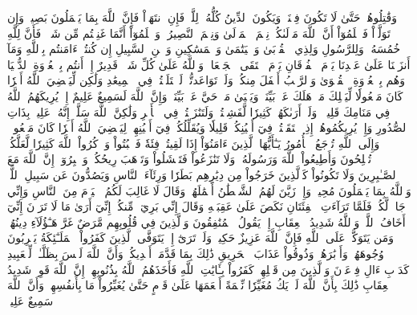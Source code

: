وَقَٰتِلُوهُمۡ حَتَّىٰ لَا تَكُونَ فِتۡنَةٞ وَيَكُونَ ٱلدِّينُ كُلُّهُۥ لِلَّهِۚ فَإِنِ ٱنتَهَوۡاْ فَإِنَّ ٱللَّهَ بِمَا يَعۡمَلُونَ بَصِيرٞ
وَإِن تَوَلَّوۡاْ فَٱعۡلَمُوٓاْ أَنَّ ٱللَّهَ مَوۡلَىٰكُمۡۚ نِعۡمَ ٱلۡمَوۡلَىٰ وَنِعۡمَ ٱلنَّصِيرُ
۞وَٱعۡلَمُوٓاْ أَنَّمَا غَنِمۡتُم مِّن شَيۡءٖ فَأَنَّ لِلَّهِ خُمُسَهُۥ وَلِلرَّسُولِ وَلِذِي ٱلۡقُرۡبَىٰ وَٱلۡيَتَٰمَىٰ وَٱلۡمَسَٰكِينِ وَٱبۡنِ ٱلسَّبِيلِ إِن كُنتُمۡ ءَامَنتُم بِٱللَّهِ وَمَآ أَنزَلۡنَا عَلَىٰ عَبۡدِنَا يَوۡمَ ٱلۡفُرۡقَانِ يَوۡمَ ٱلۡتَقَى ٱلۡجَمۡعَانِۗ وَٱللَّهُ عَلَىٰ كُلِّ شَيۡءٖ قَدِيرٌ
إِذۡ أَنتُم بِٱلۡعُدۡوَةِ ٱلدُّنۡيَا وَهُم بِٱلۡعُدۡوَةِ ٱلۡقُصۡوَىٰ وَٱلرَّكۡبُ أَسۡفَلَ مِنكُمۡۚ وَلَوۡ تَوَاعَدتُّمۡ لَٱخۡتَلَفۡتُمۡ فِي ٱلۡمِيعَٰدِ وَلَٰكِن لِّيَقۡضِيَ ٱللَّهُ أَمۡرٗا كَانَ مَفۡعُولٗا لِّيَهۡلِكَ مَنۡ هَلَكَ عَنۢ بَيِّنَةٖ وَيَحۡيَىٰ مَنۡ حَيَّ عَنۢ بَيِّنَةٖۗ وَإِنَّ ٱللَّهَ لَسَمِيعٌ عَلِيمٌ
إِذۡ يُرِيكَهُمُ ٱللَّهُ فِي مَنَامِكَ قَلِيلٗاۖ وَلَوۡ أَرَىٰكَهُمۡ كَثِيرٗا لَّفَشِلۡتُمۡ وَلَتَنَٰزَعۡتُمۡ فِي ٱلۡأَمۡرِ وَلَٰكِنَّ ٱللَّهَ سَلَّمَۚ إِنَّهُۥ عَلِيمُۢ بِذَاتِ ٱلصُّدُورِ
وَإِذۡ يُرِيكُمُوهُمۡ إِذِ ٱلۡتَقَيۡتُمۡ فِيٓ أَعۡيُنِكُمۡ قَلِيلٗا وَيُقَلِّلُكُمۡ فِيٓ أَعۡيُنِهِمۡ لِيَقۡضِيَ ٱللَّهُ أَمۡرٗا كَانَ مَفۡعُولٗاۗ وَإِلَى ٱللَّهِ تُرۡجَعُ ٱلۡأُمُورُ
يَـٰٓأَيُّهَا ٱلَّذِينَ ءَامَنُوٓاْ إِذَا لَقِيتُمۡ فِئَةٗ فَٱثۡبُتُواْ وَٱذۡكُرُواْ ٱللَّهَ كَثِيرٗا لَّعَلَّكُمۡ تُفۡلِحُونَ
وَأَطِيعُواْ ٱللَّهَ وَرَسُولَهُۥ وَلَا تَنَٰزَعُواْ فَتَفۡشَلُواْ وَتَذۡهَبَ رِيحُكُمۡۖ وَٱصۡبِرُوٓاْۚ إِنَّ ٱللَّهَ مَعَ ٱلصَّـٰبِرِينَ
وَلَا تَكُونُواْ كَٱلَّذِينَ خَرَجُواْ مِن دِيَٰرِهِم بَطَرٗا وَرِئَآءَ ٱلنَّاسِ وَيَصُدُّونَ عَن سَبِيلِ ٱللَّهِۚ وَٱللَّهُ بِمَا يَعۡمَلُونَ مُحِيطٞ
وَإِذۡ زَيَّنَ لَهُمُ ٱلشَّيۡطَٰنُ أَعۡمَٰلَهُمۡ وَقَالَ لَا غَالِبَ لَكُمُ ٱلۡيَوۡمَ مِنَ ٱلنَّاسِ وَإِنِّي جَارٞ لَّكُمۡۖ فَلَمَّا تَرَآءَتِ ٱلۡفِئَتَانِ نَكَصَ عَلَىٰ عَقِبَيۡهِ وَقَالَ إِنِّي بَرِيٓءٞ مِّنكُمۡ إِنِّيٓ أَرَىٰ مَا لَا تَرَوۡنَ إِنِّيٓ أَخَافُ ٱللَّهَۚ وَٱللَّهُ شَدِيدُ ٱلۡعِقَابِ
إِذۡ يَقُولُ ٱلۡمُنَٰفِقُونَ وَٱلَّذِينَ فِي قُلُوبِهِم مَّرَضٌ غَرَّ هَـٰٓؤُلَآءِ دِينُهُمۡۗ وَمَن يَتَوَكَّلۡ عَلَى ٱللَّهِ فَإِنَّ ٱللَّهَ عَزِيزٌ حَكِيمٞ
وَلَوۡ تَرَىٰٓ إِذۡ يَتَوَفَّى ٱلَّذِينَ كَفَرُواْ ٱلۡمَلَـٰٓئِكَةُ يَضۡرِبُونَ وُجُوهَهُمۡ وَأَدۡبَٰرَهُمۡ وَذُوقُواْ عَذَابَ ٱلۡحَرِيقِ
ذَٰلِكَ بِمَا قَدَّمَتۡ أَيۡدِيكُمۡ وَأَنَّ ٱللَّهَ لَيۡسَ بِظَلَّـٰمٖ لِّلۡعَبِيدِ
كَدَأۡبِ ءَالِ فِرۡعَوۡنَ وَٱلَّذِينَ مِن قَبۡلِهِمۡۚ كَفَرُواْ بِـَٔايَٰتِ ٱللَّهِ فَأَخَذَهُمُ ٱللَّهُ بِذُنُوبِهِمۡۚ إِنَّ ٱللَّهَ قَوِيّٞ شَدِيدُ ٱلۡعِقَابِ
ذَٰلِكَ بِأَنَّ ٱللَّهَ لَمۡ يَكُ مُغَيِّرٗا نِّعۡمَةً أَنۡعَمَهَا عَلَىٰ قَوۡمٍ حَتَّىٰ يُغَيِّرُواْ مَا بِأَنفُسِهِمۡ وَأَنَّ ٱللَّهَ سَمِيعٌ عَلِيمٞ
